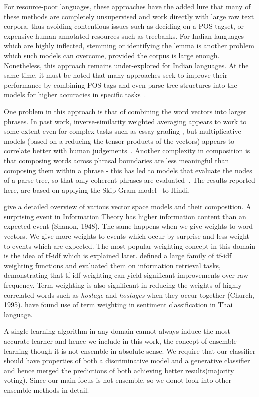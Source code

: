 \documentclass[11pt,a4paper]{article}
\begin{document}
For resource-poor languages, these approaches have the added lure that many of these methods are completely unsupervised and work directly with large raw text corpora, thus avoiding contentious issues such as deciding on a POS-tagset, or expensive human annotated resources such as treebanks.  For Indian languages which are highly inflected, stemming or identifying the lemma is another problem
which such models can overcome, provided the corpus is large enough. Nonetheless, this approach remains under-explored for Indian languages. At the same time, it must be noted that many approaches seek to improve their performance by combining POS-tags and even parse tree structures into the models for higher accuracies in specific tasks~\cite{Socher:13}. 

One problem in this approach is that of  combining the word vectors into larger phrases. In past work, inverse-similarity weighted averaging appears to work to some extent even for complex tasks such as essay grading \cite{Landauer:03}, but multiplicative models (based on a reducing the tensor products of the vectors) appears to correlate better with human judgements~\cite{Mitchell:08,Socher:13}.
Another complexity in composition is that composing words across phrasal boundaries are less meaningful than composing them within a phrase - this has led to models that evaluate the nodes of a parse tree, so that only coherent phrases are evaluated~\cite{Socher:13}. The results reported here, are based on applying the Skip-Gram  model~\cite{Mikolov:13b} to Hindi. 

\cite{Turney:10} give a detailed overview of various vector space models and their composition. A surprising event in Information Theory has higher information content than an expected event (Shanon, 1948). The same happens when we give weights to word vectors. We give more weights to events which occur by surprise and less weight to events which are expected. The most popular weighting concept in this domain is the idea of tf-idf which is explained later. \cite{Salton:88} defined a large family of tf-idf weighting functions and evaluated them on information retrieval tasks, demonstrating that tf-idf weighting can yield significant improvements over raw frequency. Term weighting is also significant in reducing the weights of highly correlated words such as \emph{hostage} and \emph{hostages} when they occur together (Church, 1995). \cite{Chirawichitchai:14} have found use of term weighting in sentiment classification in Thai language.

A single learning algorithm in any domain cannot always induce the most accurate learner and hence we include in this work, the concept of ensemble learning though it is not ensemble in absolute sense. We require that our classifier should have properties of both a discriminative model and a generative classifier and hence merged the predictions of both achieving better results(majority voting). Since our main focus is not ensemble, so we donot look into other ensemble methods in detail.
\end{document}
